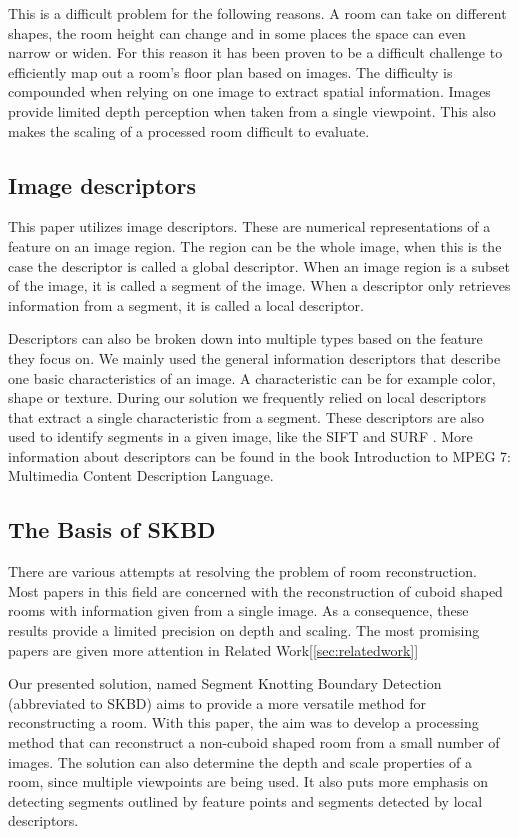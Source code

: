 This is a difficult problem for the following reasons. A room can take on different shapes, the room height can change and in some places the space can even narrow or widen. For this reason it has been proven to be a difficult challenge to efficiently map out a room's floor plan based on images. The difficulty is compounded when relying on one image to extract spatial information. Images provide limited depth perception when taken from a single viewpoint. This also makes the scaling of a processed room difficult to evaluate.

\subsection{Image descriptors}
This paper utilizes image descriptors. These are numerical representations of a feature on an image region. The region can be the whole image, when this is the case the descriptor is called a global descriptor. When an image region is a subset of the image, it is called a segment of the image. When a descriptor only retrieves information from a segment, it is called a local descriptor.

Descriptors can also be broken down into multiple types based on the feature they focus on. We mainly used the general information descriptors that describe one basic characteristics of an image. A characteristic can be for example color, shape or texture. During our solution we frequently relied on local descriptors that extract a single characteristic from a segment. These descriptors are also used to identify segments in a given image, like the SIFT \cite{lowe2004distinctive} and SURF \cite{speeduprobustfeatures}. More information about descriptors can be found in the book Introduction to MPEG 7: Multimedia Content Description Language\cite{manjunath2002mpeg7}.




\subsection{The Basis of SKBD} %
There are various attempts at resolving the problem of room reconstruction. Most papers in this field are concerned with the reconstruction of cuboid shaped rooms with information given from a single image. As a consequence, these results provide a limited precision on depth and scaling. The most promising papers are given more attention in Related Work[\ref{sec:relatedwork}]

Our presented solution, named Segment Knotting Boundary Detection (abbreviated to SKBD) aims to provide a more versatile method for reconstructing a room. With this paper, the aim was to develop a processing method that can reconstruct a non-cuboid shaped room from a small number of images. The solution can also determine the depth and scale properties of a room, since multiple viewpoints are being used. It also puts more emphasis on detecting segments outlined by feature points and segments detected by local descriptors. 

